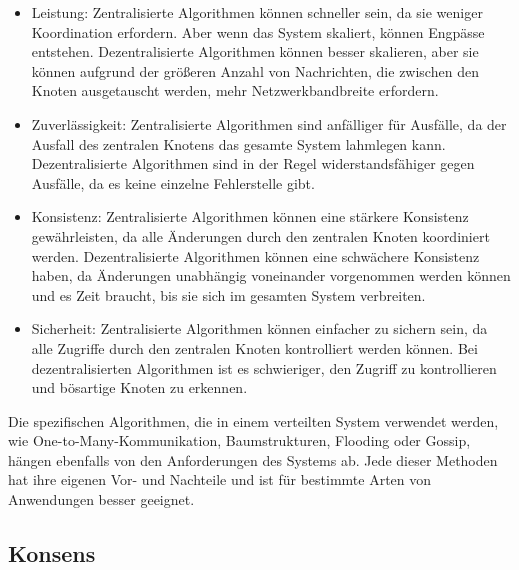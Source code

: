 \begin{itemize}
\item Leistung: Zentralisierte Algorithmen können schneller sein, da sie weniger Koordination erfordern. Aber wenn das System skaliert, können Engpässe entstehen. Dezentralisierte Algorithmen können besser skalieren, aber sie können aufgrund der größeren Anzahl von Nachrichten, die zwischen den Knoten ausgetauscht werden, mehr Netzwerkbandbreite erfordern.
\item Zuverlässigkeit: Zentralisierte Algorithmen sind anfälliger für Ausfälle, da der Ausfall des zentralen Knotens das gesamte System lahmlegen kann. Dezentralisierte Algorithmen sind in der Regel widerstandsfähiger gegen Ausfälle, da es keine einzelne Fehlerstelle gibt.
\item Konsistenz: Zentralisierte Algorithmen können eine stärkere Konsistenz gewährleisten, da alle Änderungen durch den zentralen Knoten koordiniert werden. Dezentralisierte Algorithmen können eine schwächere Konsistenz haben, da Änderungen unabhängig voneinander vorgenommen werden können und es Zeit braucht, bis sie sich im gesamten System verbreiten.
\item Sicherheit: Zentralisierte Algorithmen können einfacher zu sichern sein, da alle Zugriffe durch den zentralen Knoten kontrolliert werden können. Bei dezentralisierten Algorithmen ist es schwieriger, den Zugriff zu kontrollieren und bösartige Knoten zu erkennen.
\end{itemize}
Die spezifischen Algorithmen, die in einem verteilten System verwendet werden, wie One-to-Many-Kommunikation, Baumstrukturen, Flooding oder Gossip, hängen ebenfalls von den Anforderungen des Systems ab. Jede dieser Methoden hat ihre eigenen Vor- und Nachteile und ist für bestimmte Arten von Anwendungen besser geeignet.


\subsection{Konsens}

